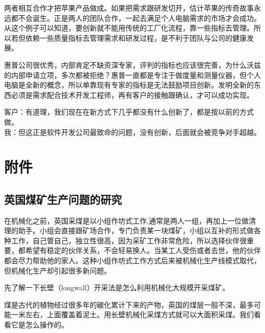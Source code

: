 两者相互合作才把苹果产品做成。如果把需求跟研发切开，估计苹果的传奇故事永远都不会诞生。正是两人的团队合作，一起去满足个人电脑需求的市场才会成功。从这个例子可以知道，要创新就不能用传统的工厂化流程，靠一些指标去管理。所以若但依赖一些质量指标去管理需求和研发过程，是不利于团队与公司的健康发展。

惠普公司很优秀，内部肯定不缺资深专家，评判的指标也应该很完善，为什么沃兹的内部申请立项，多次都被拒绝？惠普一直都是专注于做度量和测量仪器，但个人电脑是全新的概念，所以单靠现有专家的指标是无法鼓励项目创新。发明全新的东西必须是需求配合技术开发工程师，再有客户的接触跟确认，才可以成功实现。

客户：有道理，我们现在在新方式下几乎都没有什么创新了，都是按以前的方式做。\\
我：但这正是软件开发公司最致命的问题，没有创新，后面就会被竞争对手超越。\\

\hypertarget{ux9644ux4ef6}{%
\section{附件}\label{ux9644ux4ef6}}

\hypertarget{ux82f1ux56fdux7164ux77ffux751fux4ea7ux95eeux9898ux7684ux7814ux7a76}{%
\subsection{英国煤矿生产问题的研究}\label{ux82f1ux56fdux7164ux77ffux751fux4ea7ux95eeux9898ux7684ux7814ux7a76}}

在机械化之前，英国采煤是以小组作坊式工作,通常是两人一组，再加上一位做清理的助手。小组会直接跟矿场合作，专门负责某一块煤矿，小组以互补的形式做各种工作，自己管自己，独立性很高，因为采矿工作非常危险，所以选择伙伴很重要，都希望有稳定的伙伴关系，不会轻易换人。当某工人受伤或者去世，他的伙伴都会尽力帮助他的家人。这种小组作坊式工作方式后来被机械化生产线模式取代，但机械化生产却引起很多新问题。

先了解一下长壁（longwall）开采法是怎么利用机械化大规模开采煤矿。

煤是古代的植物经过很多年的碳化累计下来的产物，英国的煤层一般不深，最多可能一米左右，上面覆盖着泥土。用长壁机械化采煤方式就可以大面积采煤。我们看看它是怎么操作的。


